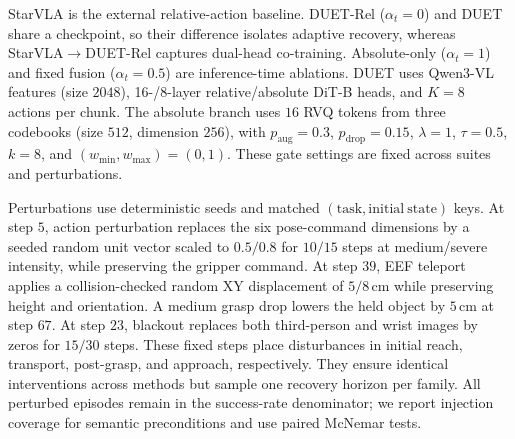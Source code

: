 \documentclass[letterpaper, 10 pt, conference]{ieeeconf}
\begin{document}
StarVLA \cite{starvla} is the external relative-action baseline. DUET-Rel ($\alpha_t{=}0$) and DUET share a checkpoint, so their difference isolates adaptive recovery, whereas StarVLA$\to$DUET-Rel captures dual-head co-training. Absolute-only ($\alpha_t{=}1$) and fixed fusion ($\alpha_t{=}0.5$) are inference-time ablations. DUET uses Qwen3-VL features (size $2048$), 16-/8-layer relative/absolute DiT-B heads, and $K{=}8$ actions per chunk. The absolute branch uses $16$ RVQ tokens from three codebooks (size $512$, dimension $256$), with $p_{\mathrm{aug}}{=}0.3$, $p_{\mathrm{drop}}{=}0.15$, $\lambda{=}1$, $\tau{=}0.5$, $k{=}8$, and $(w_{\min},w_{\max}){=}(0,1)$. These gate settings are fixed across suites and perturbations.

Perturbations use deterministic seeds and matched $(\mathrm{task},\mathrm{initial\ state})$ keys. At step $5$, action perturbation replaces the six pose-command dimensions by a seeded random unit vector scaled to $0.5/0.8$ for $10/15$ steps at medium/severe intensity, while preserving the gripper command. At step $39$, EEF teleport applies a collision-checked random XY displacement of $5/8$\,cm while preserving height and orientation. A medium grasp drop lowers the held object by $5$\,cm at step $67$. At step $23$, blackout replaces both third-person and wrist images by zeros for $15/30$ steps. These fixed steps place disturbances in initial reach, transport, post-grasp, and approach, respectively. They ensure identical interventions across methods but sample one recovery horizon per family. All perturbed episodes remain in the success-rate denominator; we report injection coverage for semantic preconditions and use paired McNemar tests.

\begin{table}[t]
\caption{Failure families and affected OOD quantities.}
\label{tab:taxonomy}
\centering
{}
\end{table}
\end{document}
